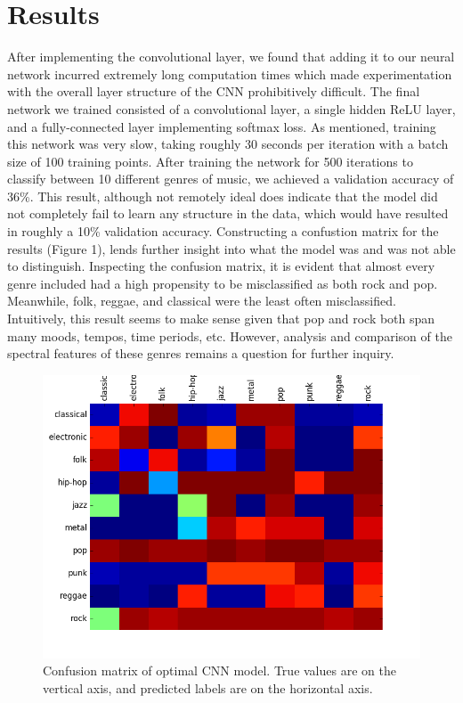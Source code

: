 \documentclass{article} %
\begin{document}
\section{Results}
After implementing the convolutional layer, we found that adding it to our neural network incurred extremely long computation times which made experimentation with the overall layer structure of the CNN prohibitively difficult. The final network we trained consisted of a convolutional layer, a single hidden ReLU layer, and a fully-connected layer implementing softmax loss. As mentioned, training this network was very slow, taking roughly 30 seconds per iteration with a batch size of 100 training points. After training the network for 500 iterations to classify between 10 different genres of music, we achieved a validation accuracy of 36\%. This result, although not remotely ideal does indicate that the model did not completely fail to learn any structure in the data, which would have resulted in roughly a 10\% validation accuracy. Constructing a confustion matrix for the results (Figure 1), lends further insight into what the model was and was not able to distinguish. Inspecting the confusion matrix, it is evident that almost every genre included had a high propensity to be misclassified as both rock and pop. Meanwhile, folk, reggae, and classical were the least often misclassified. Intuitively, this result seems to make sense given that pop and rock both span many moods, tempos, time periods, etc. However, analysis and comparison of the spectral features of these genres remains a question for further inquiry.
\begin{figure}[h]
\centering
\includegraphics[scale=0.5]{confusion}
\caption{Confusion matrix of optimal CNN model. True values are on the vertical axis, and predicted labels are on the horizontal axis.}
\end{figure}
\end{document}
